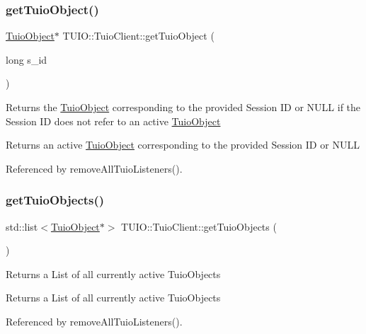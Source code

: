 \subsubsection{\texorpdfstring{get\+Tuio\+Object()}{getTuioObject()}}
{\footnotesize\ttfamily \hyperlink{class_t_u_i_o_1_1_tuio_object}{Tuio\+Object}$\ast$ T\+U\+I\+O\+::\+Tuio\+Client\+::get\+Tuio\+Object (\begin{DoxyParamCaption}\item[{long}]{s\+\_\+id }\end{DoxyParamCaption})}

Returns the \hyperlink{class_t_u_i_o_1_1_tuio_object}{Tuio\+Object} corresponding to the provided Session ID or N\+U\+LL if the Session ID does not refer to an active \hyperlink{class_t_u_i_o_1_1_tuio_object}{Tuio\+Object}

\begin{DoxyReturn}{Returns}
an active \hyperlink{class_t_u_i_o_1_1_tuio_object}{Tuio\+Object} corresponding to the provided Session ID or N\+U\+LL 
\end{DoxyReturn}


Referenced by remove\+All\+Tuio\+Listeners().

\mbox{\label{class_t_u_i_o_1_1_tuio_client_ad9d968142e2e6d9639b685152ee2cf1b}} 
\subsubsection{\texorpdfstring{get\+Tuio\+Objects()}{getTuioObjects()}}
{\footnotesize\ttfamily std\+::list$<$\hyperlink{class_t_u_i_o_1_1_tuio_object}{Tuio\+Object}$\ast$$>$ T\+U\+I\+O\+::\+Tuio\+Client\+::get\+Tuio\+Objects (\begin{DoxyParamCaption}{ }\end{DoxyParamCaption})}

Returns a List of all currently active Tuio\+Objects

\begin{DoxyReturn}{Returns}
a List of all currently active Tuio\+Objects 
\end{DoxyReturn}


Referenced by remove\+All\+Tuio\+Listeners().

\mbox{\label{class_t_u_i_o_1_1_tuio_client_a6388e3149fd5c0a2da9d6aeeabf7d784}} 
